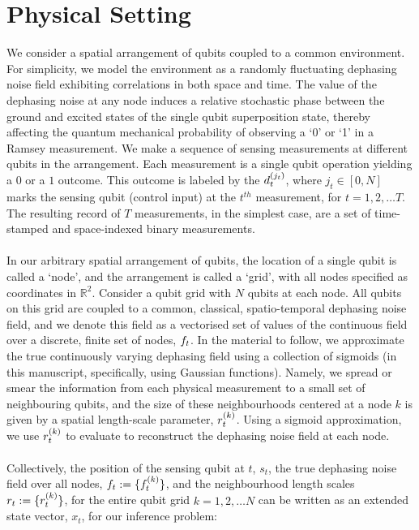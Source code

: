 \section{Physical Setting}\label{sec:physicalsetting}

We consider a spatial arrangement of qubits coupled to a common environment. For simplicity, we model the environment as a randomly fluctuating dephasing noise field exhibiting correlations in both space and time. The value of the dephasing noise at any node induces a relative stochastic phase between the ground and excited states of the single qubit superposition state, thereby affecting the  quantum mechanical probability of observing a  `0' or `1' in a Ramsey measurement.  We make a sequence of sensing measurements  at different qubits in the arrangement. Each measurement is a single qubit operation yielding a $0$ or a $1$ outcome. This outcome is labeled by the $d^{( j_t )}_{t}$, where $j_t \in [0, N]$ marks the sensing qubit (control input) at the $t^{th}$ measurement,  for $t = 1,2, \hdots T$. The resulting record of $T$ measurements, in the simplest case, are a set of time-stamped and space-indexed binary measurements. \\
\\ 
In our arbitrary spatial arrangement of qubits, the location of a single qubit is called a `node', and the arrangement is called a `grid', with all nodes specified as coordinates in $\mathbb{R}^2$. Consider a qubit grid with $N$ qubits at each node. All qubits on this grid are coupled to a common, classical, spatio-temporal dephasing noise field, and we denote this field as a vectorised set of values of the continuous field over a discrete, finite set of nodes, $f_{ t}$. In the material to follow, we approximate the true  continuously varying dephasing field using a collection of sigmoids (in this manuscript, specifically, using Gaussian functions). Namely, we spread or smear the information from each physical measurement to a small set of neighbouring qubits, and the size of these neighbourhoods centered at a node $k$ is given by a spatial length-scale parameter, $r^{( k )}_{t}$. Using a sigmoid approximation, we use $r^{( k )}_{t}$ to evaluate to reconstruct the dephasing noise field at each node. \\
\\
Collectively, the position of the sensing qubit at $t$, $s_t$, the true dephasing noise field over all nodes, $ f_{ t}:=\{f^{( k )}_{t} \}$, and the neighbourhood length scales $r_{ t}:= \{r^{( k )}_{t}\}$, for the entire qubit grid $ k= 1, 2, \hdots N $ can be written as an extended state vector, $x_t$, for our inference problem:

